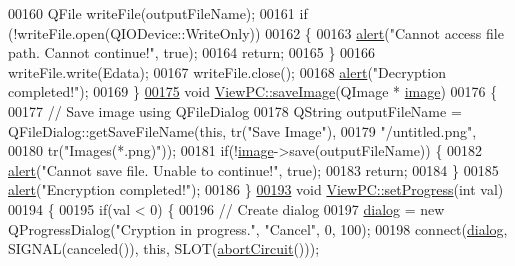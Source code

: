 \begin{DoxyCode}
00160     QFile writeFile(outputFileName);
00161     \textcolor{keywordflow}{if} (!writeFile.open(QIODevice::WriteOnly))
00162     \{
00163         \mbox{\hyperlink{class_view_p_c_a7c467169467789561078abc9d4fe57bd}{alert}}(\textcolor{stringliteral}{"Cannot access file path. Cannot continue!"}, \textcolor{keyword}{true});
00164         \textcolor{keywordflow}{return};
00165     \}
00166     writeFile.write(Edata);
00167     writeFile.close();
00168     \mbox{\hyperlink{class_view_p_c_a7c467169467789561078abc9d4fe57bd}{alert}}(\textcolor{stringliteral}{"Decryption completed!"});
00169 \}
\mbox{\hyperlink{class_view_p_c_a7901ce10ffaaf2387bef1db7feea342d}{00175}} \textcolor{keywordtype}{void} \mbox{\hyperlink{class_view_p_c_a7901ce10ffaaf2387bef1db7feea342d}{ViewPC::saveImage}}(QImage * \mbox{\hyperlink{namespacetests-setup_ad55b685280f549e15688a94cbb89f512}{image}})
00176 \{
00177     \textcolor{comment}{// Save image using QFileDialog}
00178     QString outputFileName = QFileDialog::getSaveFileName(\textcolor{keyword}{this}, tr(\textcolor{stringliteral}{"Save Image"}),
00179                                \textcolor{stringliteral}{"/untitled.png"},
00180                                tr(\textcolor{stringliteral}{"Images(*.png)"}));
00181     \textcolor{keywordflow}{if}(!\mbox{\hyperlink{namespacetests-setup_ad55b685280f549e15688a94cbb89f512}{image}}->save(outputFileName)) \{
00182         \mbox{\hyperlink{class_view_p_c_a7c467169467789561078abc9d4fe57bd}{alert}}(\textcolor{stringliteral}{"Cannot save file. Unable to continue!"}, \textcolor{keyword}{true});
00183         \textcolor{keywordflow}{return};
00184     \}
00185     \mbox{\hyperlink{class_view_p_c_a7c467169467789561078abc9d4fe57bd}{alert}}(\textcolor{stringliteral}{"Encryption completed!"});
00186 \}
\mbox{\hyperlink{class_view_p_c_a9c32a1fdb6ead84e5ada8fba8860c7ed}{00193}} \textcolor{keywordtype}{void} \mbox{\hyperlink{class_view_p_c_a9c32a1fdb6ead84e5ada8fba8860c7ed}{ViewPC::setProgress}}(\textcolor{keywordtype}{int} val)
00194 \{
00195     \textcolor{keywordflow}{if}(val < 0) \{
00196         \textcolor{comment}{// Create dialog}
00197         \mbox{\hyperlink{class_view_p_c_a31abbb470fe329b44e6ffee202b903ca}{dialog}} = \textcolor{keyword}{new} QProgressDialog(\textcolor{stringliteral}{"Cryption in progress."}, \textcolor{stringliteral}{"Cancel"}, 0, 100);
00198         connect(\mbox{\hyperlink{class_view_p_c_a31abbb470fe329b44e6ffee202b903ca}{dialog}}, SIGNAL(canceled()), \textcolor{keyword}{this}, SLOT(\mbox{\hyperlink{class_view_p_c_ad7ba2fcf1d17862de15e32432823f7b0}{abortCircuit}}()));

\end{DoxyCode}
